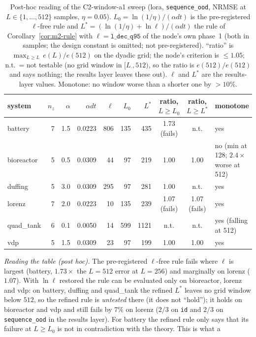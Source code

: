 \begin{table}[ht]\centering\small
\caption{Post-hoc reading of the C2-window-a1 sweep (lora, \texttt{sequence\_ood}, NRMSE at $L\in\{1,\dots,512\}$
samples, $\eta=0.05$). $L_0=\ln(1/\eta)/(\alpha dt)$ is the pre-registered $\ell$-free rule and
$L^*=(\ln(1/\eta)+\ln\ell)/(\alpha dt)$ the rule of Corollary~\ref{cor:m2-rule} with $\ell=\texttt{l\_dec\_q95}$ of the
node's own phase~1 (both in samples; the design constant is omitted; not pre-registered). ``ratio'' is
$\max_{L\ge L_\cdot}e(L)/e(512)$ on the dyadic grid; the node's criterion is $\le1.05$; n.t.\ = not testable (no grid
window in $[L_\cdot,512)$, so the ratio is $e(512)/e(512)$ and says nothing; the results layer leaves these out).
$\ell$ and $L^*$ are the results-layer values. Monotone: no window worse than a shorter one by $>10\%$.}\label{tab:m2-window-rule}
\footnotesize
\begin{tabular}{@{}lrrrrrrccl@{}}\hline
system & $n_z$ & $\alpha$ & $\alpha dt$ & $\ell$ & $L_0$ & $L^*$ & ratio, $L\ge L_0$ & ratio, $L\ge L^*$ & monotone\\\hline
battery    & 7 & 1.5 & 0.0223 & 806 & 135 & 435  & 1.73 (fails) & n.t. & yes\\
bioreactor & 5 & 0.5 & 0.0309 & 44  & 97  & 219  & 1.00 & 1.00 & no (min at 128; $2.4\times$ worse at 512)\\
duffing    & 5 & 3.0 & 0.0309 & 295 & 97  & 281  & 1.00 & n.t. & yes\\
lorenz     & 7 & 2.0 & 0.0223 & 10  & 135 & 239  & 1.07 (fails) & 1.07 (fails) & yes\\
quad\_tank & 6 & 0.1 & 0.0050 & 14  & 599 & 1121 & n.t. & n.t. & yes (falling at 512)\\
vdp        & 5 & 1.5 & 0.0309 & 23  & 97  & 199  & 1.00 & 1.00 & yes\\\hline
\end{tabular}
\end{table}
\noindent\emph{Reading the table (post hoc).} The pre-registered $\ell$-free rule fails where $\ell$ is largest
(battery, $1.73\times$ the $L=512$ error at $L=256$) and marginally on lorenz ($1.07$). With $\ln\ell$ restored the
rule can be evaluated only on bioreactor, lorenz and vdp: on battery, duffing and quad\_tank the refined $L^*$ leaves no
grid window below $512$, so the refined rule is \emph{untested} there (it does not ``hold''); it holds on bioreactor and
vdp and still fails by $7\%$ on lorenz ($2/3$ on \texttt{id} and $2/3$ on \texttt{sequence\_ood} in the results layer).
For battery the refined rule only says that its failure at $L\ge L_0$ is not in contradiction with the theory. This is what a
